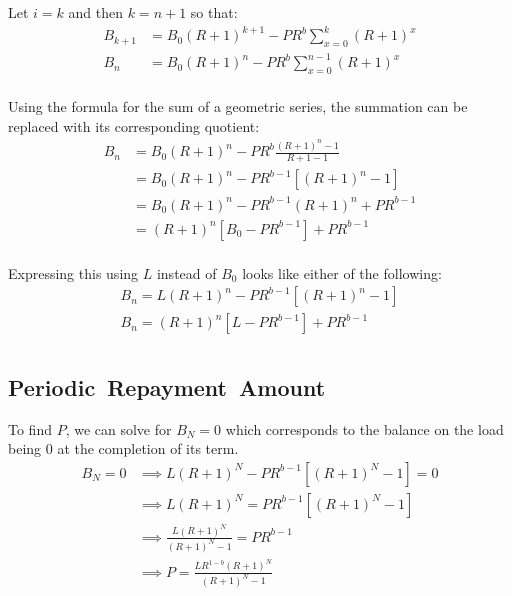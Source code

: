 Let \(i = k\) and then \(k = n + 1\) so that:
\begin{equation*}
    \begin{split}
        B_{k + 1} & = B_{0}(R + 1)^{k + 1} - PR^{b}\sum_{x = 0}^{k}(R + 1)^{x}\\
        B_{n} & = B_{0}(R + 1)^{n} - PR^{b}\sum_{x = 0}^{n - 1}(R + 1)^{x}\\
    \end{split}
\end{equation*}

Using the formula for the sum of a geometric series, the summation can be replaced with its corresponding
 quotient:
\begin{equation*}
    \begin{split}
        B_{n} & = B_{0}(R + 1)^{n} - PR^{b}\frac{(R + 1)^{n} - 1}{R + 1 - 1}\\
        & = B_{0}(R + 1)^{n} - PR^{b - 1}\left[(R + 1)^{n} - 1\right]\\
        & = B_{0}(R + 1)^{n} - PR^{b - 1}(R + 1)^{n} + PR^{b - 1}\\
        & = (R + 1)^{n}\left[B_{0} - PR^{b - 1}\right] + PR^{b - 1}\\
    \end{split}
\end{equation*}

Expressing this using \(L\) instead of \(B_{0}\) looks like either of the following:
\begin{gather*}
    B_{n} = L(R + 1)^{n} - PR^{b - 1}\left[(R + 1)^{n} - 1\right]\\
    B_{n} = (R + 1)^{n}\left[L - PR^{b - 1}\right] + PR^{b - 1}\\
\end{gather*}


\subsection{Periodic~Repayment~Amount}\label{subsec:frl-periodic-repayment-amount}
To find \(P\), we can solve for \(B_{N} = 0\) which corresponds to the balance on the load being 0 at the completion of its term.
\begin{equation*}
    \begin{split}
        B_{N} = 0 & \implies L(R + 1)^{N} - PR^{b - 1}\left[(R + 1)^{N} - 1\right] = 0\\
        & \implies L(R + 1)^{N} = PR^{b - 1}\left[(R + 1)^{N} - 1\right]\\
        & \implies \frac{L(R + 1)^{N}}{(R + 1)^{N} - 1} = PR^{b - 1}\\
        & \implies P = \frac{LR^{1 - b}(R + 1)^{N}}{(R + 1)^{N} - 1}\\
    \end{split}
\end{equation*}


